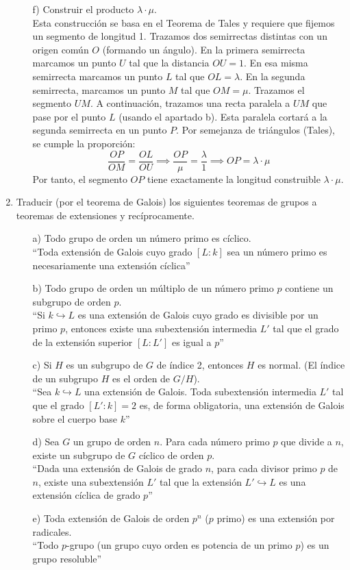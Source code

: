 \begin{enumerate}
\begin{itemize}
    \item[f)] Construir el producto $\lambda \cdot \mu$. \\
    Esta construcción se basa en el Teorema de Tales y requiere que fijemos un segmento de longitud 1. 
    Trazamos dos semirrectas distintas con un origen común $O$ (formando un ángulo). En la primera semirrecta marcamos un punto $U$ tal que la distancia $OU = 1$. En esa misma semirrecta marcamos un punto $L$ tal que $OL = \lambda$. En la segunda semirrecta, marcamos un punto $M$ tal que $OM = \mu$. Trazamos el segmento $UM$. A continuación, trazamos una recta paralela a $UM$ que pase por el punto $L$ (usando el apartado b). Esta paralela cortará a la segunda semirrecta en un punto $P$. 
    Por semejanza de triángulos (Tales), se cumple la proporción:
    $$ \frac{OP}{OM} = \frac{OL}{OU} \implies \frac{OP}{\mu} = \frac{\lambda}{1} \implies OP = \lambda \cdot \mu $$
    Por tanto, el segmento $OP$ tiene exactamente la longitud construible $\lambda \cdot \mu$.
\end{itemize}
    \item Traducir (por el teorema de Galois) los siguientes teoremas de grupos a teoremas de extensiones y recíprocamente.
    \begin{itemize}
        \item[a)] Todo grupo de orden un número primo es cíclico.\\
        ``Toda extensión de Galois cuyo grado $[L : k]$ sea un número primo es necesariamente una extensión cíclica''
        \item[b)] Todo grupo de orden un múltiplo de un número primo $p$ contiene un subgrupo de orden $p$.\\ 
        ``Si $k \hookrightarrow L$ es una extensión de Galois cuyo grado es divisible por un primo $p$, entonces existe una subextensión intermedia $L'$ tal que el grado de la extensión superior $[L : L']$ es igual a $p$''
        \item[c)] Si $H$ es un subgrupo de $G$ de índice 2, entonces $H$ es normal. (El índice de un subgrupo $H$ es el orden de $G/H$). \\
        ``Sea $k \hookrightarrow L$ una extensión de Galois. Toda subextensión intermedia $L'$ tal que el grado $[L' : k] = 2$ es, de forma obligatoria, una extensión de Galois sobre el cuerpo base $k$''
        \item[d)] Sea $G$ un grupo de orden $n$. Para cada número primo $p$ que divide a $n$, existe un subgrupo de $G$ cíclico de orden $p$. \\
        ``Dada una extensión de Galois de grado $n$, para cada divisor primo $p$ de $n$, existe una subextensión $L'$ tal que la extensión $L' \hookrightarrow L$ es una extensión cíclica de grado $p$''
        \item[e)] Toda extensión de Galois de orden $p^{n}$ ($p$ primo) es una extensión por radicales. \\
        ``Todo $p$-grupo (un grupo cuyo orden es potencia de un primo $p$) es un grupo resoluble''
    \end{itemize}\end{enumerate}
    